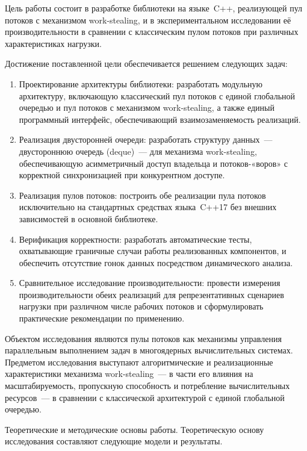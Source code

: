 Цель работы состоит в разработке библиотеки на языке~C++,
реализующей пул потоков с механизмом work-stealing, и в экспериментальном
исследовании её производительности в сравнении с классическим пулом потоков
при различных характеристиках нагрузки.

Достижение поставленной цели обеспечивается решением
следующих задач:
\begin{enumerate}
  \item Проектирование архитектуры библиотеки: разработать
    модульную архитектуру, включающую классический пул потоков с единой
    глобальной очередью и пул потоков с механизмом work-stealing, а также
    единый программный интерфейс, обеспечивающий взаимозаменяемость
    реализаций.

  \item Реализация двусторонней очереди: разработать структуру
    данных~--- двустороннюю очередь (deque)~--- для механизма work-stealing,
    обеспечивающую асимметричный доступ владельца и потоков-«воров» с
    корректной синхронизацией при конкурентном доступе.

  \item Реализация пулов потоков: построить обе реализации пула
    потоков исключительно на стандартных средствах языка~C++17 без
    внешних зависимостей в основной библиотеке.

  \item Верификация корректности: разработать автоматические тесты,
    охватывающие граничные случаи работы реализованных компонентов, и
    обеспечить отсутствие гонок данных посредством динамического анализа.

  \item Сравнительное исследование производительности: провести
    измерения производительности обеих реализаций для репрезентативных
    сценариев нагрузки при различном числе рабочих потоков и сформулировать
    практические рекомендации по применению.
\end{enumerate}

Объектом исследования являются пулы потоков как механизмы управления параллельным выполнением задач
в многоядерных вычислительных системах. Предметом исследования
выступают алгоритмические и реализационные характеристики механизма
work-stealing~--- в части его влияния на масштабируемость, пропускную
способность и потребление вычислительных ресурсов~--- в сравнении с
классической архитектурой с единой глобальной очередью.

Теоретические и методические основы работы. Теоретическую основу
исследования составляют следующие модели и результаты.

